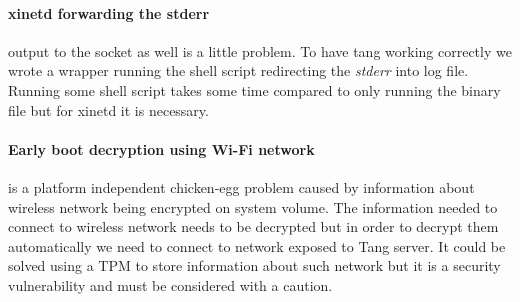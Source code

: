 \paragraph{xinetd forwarding the stderr} output to the socket as well is a little problem.
To have tang working correctly we wrote a wrapper running the shell script redirecting the {\it stderr} into log file.
Running some shell script takes some time compared to only running the binary file but for xinetd it is necessary.

\paragraph{Early boot decryption using Wi-Fi network} is a platform independent chicken-egg problem caused by information about wireless network being encrypted on system volume.
The information needed to connect to wireless network needs to be decrypted but in order to decrypt them automatically we need to connect to network exposed to Tang server.
It could be solved using a TPM to store information about such network but it is a security vulnerability and must be considered with a caution.
